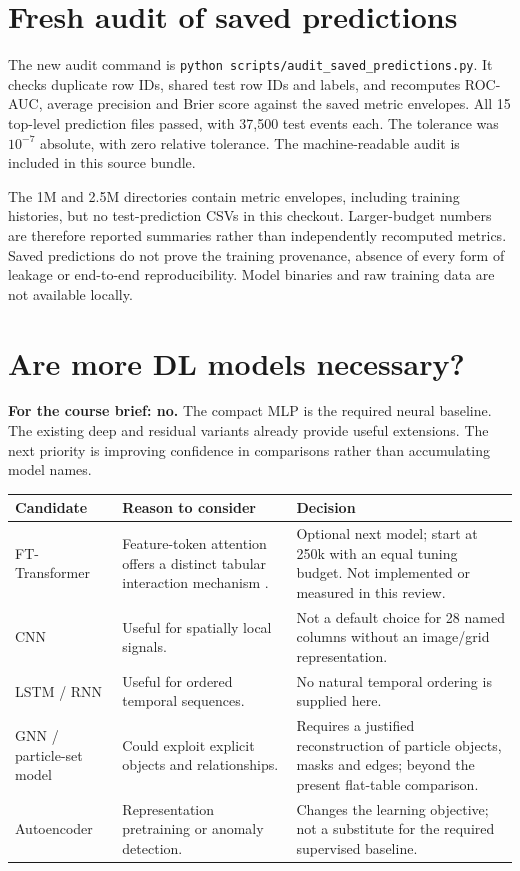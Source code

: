 \documentclass[11pt,a4paper]{article}
\begin{document}
\section{Fresh audit of saved predictions}
The new audit command is \texttt{python scripts/audit\_saved\_predictions.py}. It checks duplicate row IDs, shared test row IDs and labels, and recomputes ROC-AUC, average precision and Brier score against the saved metric envelopes. All 15 top-level prediction files passed, with 37,500 test events each. The tolerance was $10^{-7}$ absolute, with zero relative tolerance. The machine-readable audit is included in this source bundle.

The 1M and 2.5M directories contain metric envelopes, including training histories, but no test-prediction CSVs in this checkout. Larger-budget numbers are therefore reported summaries rather than independently recomputed metrics. Saved predictions do not prove the training provenance, absence of every form of leakage or end-to-end reproducibility. Model binaries and raw training data are not available locally.

\section{Are more DL models necessary?}
\textbf{For the course brief: no.} The compact MLP is the required neural baseline. The existing deep and residual variants already provide useful extensions. The next priority is improving confidence in comparisons rather than accumulating model names.

\begin{tabularx}{\linewidth}{@{}lXX@{}}\toprule
Candidate & Reason to consider & Decision\\\midrule
FT-Transformer & Feature-token attention offers a distinct tabular interaction mechanism \cite{gorishniy}. & Optional next model; start at 250k with an equal tuning budget. Not implemented or measured in this review.\\
CNN & Useful for spatially local signals. & Not a default choice for 28 named columns without an image/grid representation.\\
LSTM / RNN & Useful for ordered temporal sequences. & No natural temporal ordering is supplied here.\\
GNN / particle-set model & Could exploit explicit objects and relationships. & Requires a justified reconstruction of particle objects, masks and edges; beyond the present flat-table comparison.\\
Autoencoder & Representation pretraining or anomaly detection. & Changes the learning objective; not a substitute for the required supervised baseline.\\\bottomrule
\end{tabularx}
\end{document}
